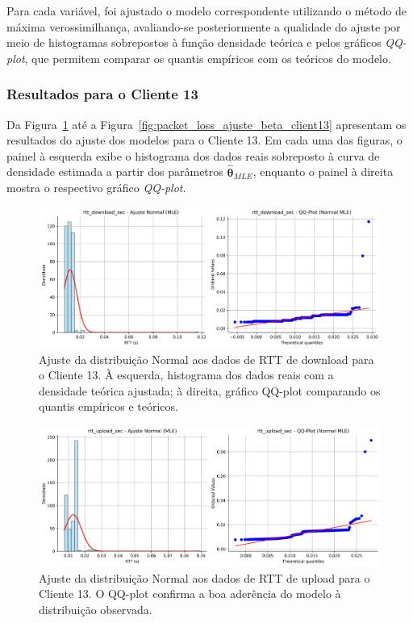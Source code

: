 \documentclass{article}
\begin{document}
Para cada variável, foi ajustado o modelo correspondente utilizando o método de máxima verossimilhança,
avaliando-se posteriormente a qualidade do ajuste por meio de histogramas sobrepostos à função densidade
teórica e pelos gráficos \textit{QQ-plot}, que permitem comparar os quantis empíricos com os teóricos do modelo.

\subsubsection{Resultados para o Cliente 13}

Da Figura~\ref{fig:rtt_download_sec_ajuste_normal_client13} até a Figura~\ref{fig:packet_loss_ajuste_beta_client13}
apresentam os resultados do ajuste dos modelos para o Cliente 13.
Em cada uma das figuras, o painel à esquerda exibe o histograma dos dados reais
sobreposto à curva de densidade estimada a partir dos parâmetros $\hat{\boldsymbol{\theta}}_{MLE}$,
enquanto o painel à direita mostra o respectivo gráfico \textit{QQ-plot}.

\begin{figure}[htp]
	\includegraphics[width=\textwidth]{../figures/mle/rtt_download_sec_ajuste_normal_client13.png}
	\caption{Ajuste da distribuição Normal aos dados de RTT de download para o Cliente 13. À esquerda, histograma dos dados reais com a densidade teórica ajustada; à direita, gráfico QQ-plot comparando os quantis empíricos e teóricos.}
	\label{fig:rtt_download_sec_ajuste_normal_client13}
\end{figure}

\begin{figure}[htp]
	\includegraphics[width=\textwidth]{../figures/mle/rtt_upload_sec_ajuste_normal_client13.png}
	\caption{Ajuste da distribuição Normal aos dados de RTT de upload para o Cliente 13. O QQ-plot confirma a boa aderência do modelo à distribuição observada.}
	\label{fig:rtt_upload_sec_ajuste_normal_client13}
\end{figure}
\end{document}
